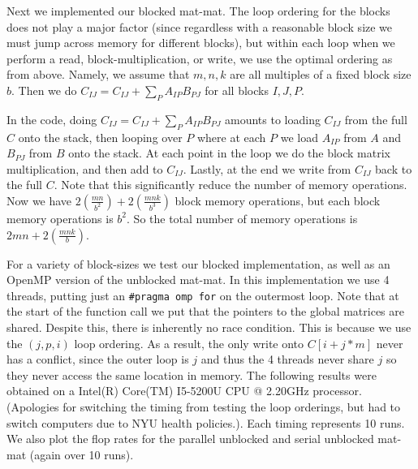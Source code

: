 \documentclass[10pt]{article}
\newcommand{\lp}{\left(}
\newcommand{\rp}{\right)}
\begin{document}
\begin{enumerate}
Next we implemented our blocked mat-mat. The loop ordering for the blocks does not play a major factor (since regardless with a reasonable block size we must jump across memory for different blocks), but within each loop when we perform a read, block-multiplication, or write, we use the optimal ordering as from above. Namely, we assume that  $m,n,k$ are all multiples of a fixed block size $b$. Then we do $C_{IJ} = C_{IJ} + \sum_{P} A_{IP} B_{PJ}$ for all blocks $I,J,P$. 

In the code, doing $C_{IJ} = C_{IJ} + \sum_{P} A_{IP} B_{PJ}$ amounts to loading $C_{IJ}$ from the full $C$ onto the stack, then looping over $P$ where at each $P$ we load $A_{IP}$ from $A$ and $B_{PJ}$ from $B$ onto the stack. At each point in the loop we do the block matrix multiplication, and then add to $C_{IJ}$. Lastly, at the end we write from $C_{IJ}$ back to the full $C$. Note that this significantly reduce the number of memory operations. Now we have $2 \lp \frac{mn}{b^{2}} \rp + 2 \lp \frac{mnk}{b^{3}} \rp$ block memory operations, but each block memory operations is $b^{2}$. So the total number of memory operations is $2 mn + 2 \lp \frac{mnk}{b} \rp$.

For a variety of block-sizes we test our blocked implementation, as well as an OpenMP version of the unblocked mat-mat. In this implementation we use 4 threads, putting just an \texttt{\#pragma omp for} on the outermost loop. Note that at the start of the function call we put that the pointers to the global matrices are shared. Despite this, there is inherently no race condition. This is because we use the $(j,p,i)$ loop ordering. As a result, the only write onto $C[i+j*m]$ never has a conflict, since the outer loop is $j$ and thus the 4 threads never share $j$ so they never access the same location in memory. The following results were obtained on a Intel(R) Core(TM) I5-5200U CPU @ 2.20GHz processor. (Apologies for switching the timing from testing the loop orderings, but had to switch computers due to NYU health policies.). Each timing represents 10 runs. We also plot the flop rates for the parallel unblocked and serial unblocked mat-mat (again over 10 runs).


\end{enumerate}
\end{document}

